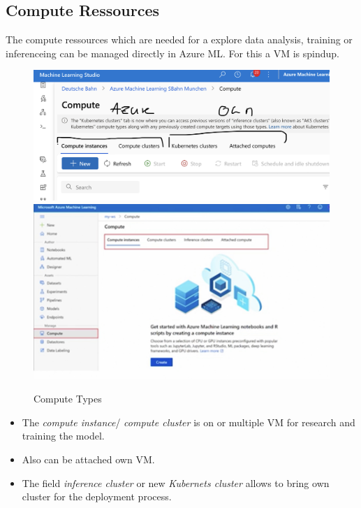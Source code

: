 \subsection{Compute Ressources}
The compute ressources which are needed for a explore data analysis, training or inferenceing can be managed directly in Azure ML. For this a \gls{VM} is spindup.\\

\begin{figure}[H]
	\centering
	\includegraphics[scale = 0.1]{attachment/chapter_10/Scc030}\\ 
	\includegraphics[scale = 0.1]{attachment/chapter_10/Scc031}
	\caption{Compute Types}
\end{figure}

\begin{itemize}
	\item The \textit{compute instance}/ \textit{compute cluster} is on or multiple \gls{VM}   for research and training the model.
	\item Also can be attached own \gls{VM}. 
	\item The field \textit{inference cluster} or new \textit{Kubernets cluster} allows to bring own cluster for the deployment process.
\end{itemize}



